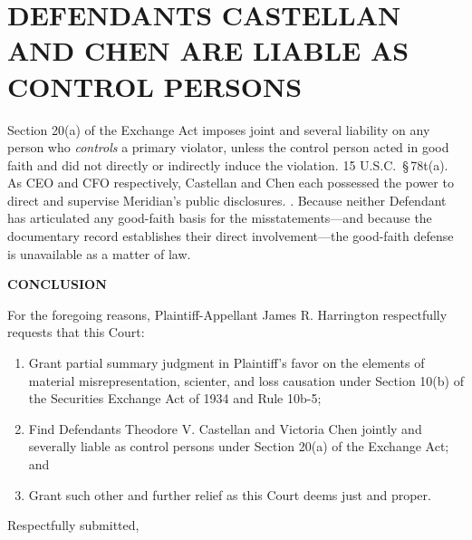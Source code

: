 \section{DEFENDANTS CASTELLAN AND CHEN ARE LIABLE AS CONTROL PERSONS}

Section 20(a) of the Exchange Act imposes joint and several liability on any person who \textit{controls} a primary violator, unless the control person acted in good faith and did not directly or indirectly induce the violation. 15 U.S.C.\ \S\,78t(a). As CEO and CFO respectively, Castellan and Chen each possessed the power to direct and supervise Meridian's public disclosures. . Because neither Defendant has articulated any good-faith basis for the misstatements---and because the documentary record establishes their direct involvement---the good-faith defense is unavailable as a matter of law.

{}
\begin{center}
  {\large\bfseries\color{accent}CONCLUSION}
\end{center}

For the foregoing reasons, Plaintiff-Appellant James R. Harrington respectfully requests that this Court:

\begin{enumerate}[label=(\arabic*),leftmargin=2.5em,itemsep=6pt,parsep=0pt]
  \item Grant partial summary judgment in Plaintiff's favor on the elements of material misrepresentation, scienter, and loss causation under Section 10(b) of the Securities Exchange Act of 1934 and Rule 10b-5;
  \item Find Defendants Theodore V. Castellan and Victoria Chen jointly and severally liable as control persons under Section 20(a) of the Exchange Act; and
  \item Grant such other and further relief as this Court deems just and proper.
\end{enumerate}

\vspace{18pt}

\noindent Respectfully submitted,

\vspace{14pt}


